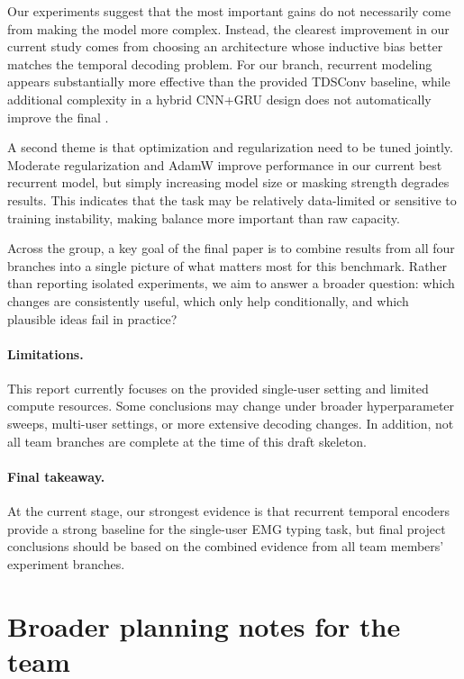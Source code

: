 \documentclass{article}
\newcommand{\cer}{\mathrm{CER}}
\begin{document}
Our experiments suggest that the most important gains do not necessarily come from making the model more complex.
Instead, the clearest improvement in our current study comes from choosing an architecture whose inductive bias better matches the temporal decoding problem.
For our branch, recurrent modeling appears substantially more effective than the provided TDSConv baseline, while additional complexity in a hybrid CNN+GRU design does not automatically improve the final \cer.

A second theme is that optimization and regularization need to be tuned jointly.
Moderate regularization and AdamW improve performance in our current best recurrent model, but simply increasing model size or masking strength degrades results.
This indicates that the task may be relatively data-limited or sensitive to training instability, making balance more important than raw capacity.

Across the group, a key goal of the final paper is to combine results from all four branches into a single picture of what matters most for this benchmark.
Rather than reporting isolated experiments, we aim to answer a broader question: which changes are consistently useful, which only help conditionally, and which plausible ideas fail in practice?

\paragraph{Limitations.}
This report currently focuses on the provided single-user setting and limited compute resources.
Some conclusions may change under broader hyperparameter sweeps, multi-user settings, or more extensive decoding changes.
In addition, not all team branches are complete at the time of this draft skeleton.

\paragraph{Final takeaway.}

At the current stage, our strongest evidence is that recurrent temporal encoders provide a strong baseline for the single-user EMG typing task, but final project conclusions should be based on the combined evidence from all team members' experiment branches.

\section*{Broader planning notes for the team}
\end{document}
